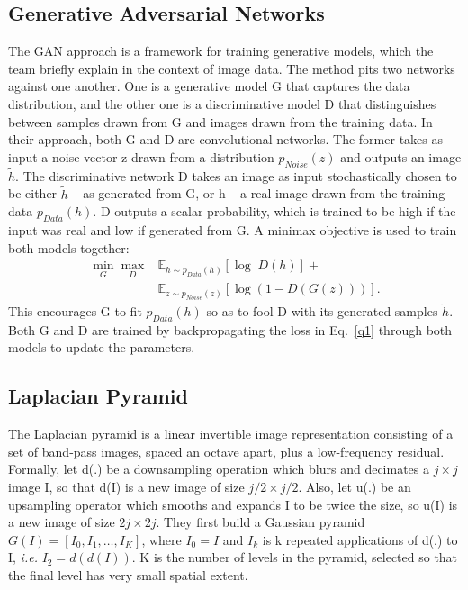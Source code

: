 \documentclass[10pt,twocolumn,letterpaper]{article}
\begin{document}
\subsection{Generative Adversarial Networks}

The GAN approach \cite{Goodfellow2014Generative} is a framework for training generative models, which the team briefly explain in the context of image data. The method pits two networks against one another. One is a generative model G that captures the data distribution, and the other one is a discriminative model D that distinguishes between samples drawn from G and images drawn from the training data. In their approach, both G and D are convolutional networks. The former takes as input a noise vector z drawn from a distribution $p_{Noise}(z)$ and outputs an image $\tilde{h}$. The discriminative network D takes an image as input stochastically chosen to be either $\tilde{h}$ – as generated from G, or h – a real image drawn from the training data $p_{Data}(h)$. D outputs a scalar probability, which is trained to be high if the input was real and low if generated from G. A minimax objective is used to train both models together:
\begin{equation}
\begin{aligned}
\min_{G}\max_{D} &\mathbb{E}_{h\sim p_{Data}(h)}[\log|D(h)]+\\
&\mathbb{E}_{z\sim p_{Noise}(z)}[\log(1-D(G(z)))].  
\end{aligned} \label{q1}
\end{equation}
This encourages G to fit $p_{Data}(h)$ so as to fool D with its generated samples $\tilde{h}$. Both G and D are trained by backpropagating the loss in Eq.~\ref{q1} through both models to update the parameters.

\subsection{Laplacian Pyramid}

The Laplacian pyramid is a linear invertible image representation consisting of a set of band-pass images, spaced an octave apart, plus a low-frequency residual. Formally, let d(.) be a downsampling operation which blurs and decimates a $j\times j$ image I, so that d(I) is a new image of size $j/2\times j/2$. Also, let u(.) be an upsampling operator which smooths and expands I to be twice the size, so u(I) is a new image of size $2j\times 2j$. They first build a Gaussian pyramid $G(I) = [I_0,I_1,\ldots,I_K]$, where $I_0 = I$ and $I_k$ is k repeated applications of d(.) to I, \emph{i.e.} $I_2 = d(d(I))$. K is the number of levels in the pyramid, selected so that the final level has very small spatial extent.
\end{document}
